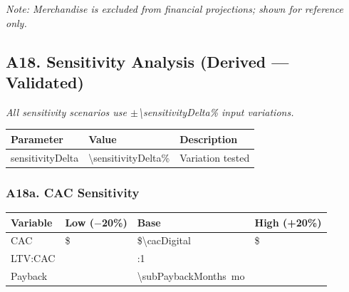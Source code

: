 \medskip
\textit{Note: Merchandise is excluded from financial projections; shown for reference only.}


\subsection*{A18. Sensitivity Analysis (Derived --- Validated)}

\textit{All sensitivity scenarios use $\pm$\num{\sensitivityDelta}\% input variations.}

\medskip
\begin{tabularx}{\linewidth}{l Y X}
\toprule
\textbf{Parameter} & \textbf{Value} & \textbf{Description} \\\midrule
sensitivityDelta & \num{\sensitivityDelta}\% & Variation tested \\
\bottomrule
\end{tabularx}

\subsubsection*{A18a. CAC Sensitivity}
\begin{tabularx}{\linewidth}{l Y Y Y}
\toprule
\textbf{Variable} & \textbf{Low ($-$20\%)} & \textbf{Base} & \textbf{High (+20\%)} \\\midrule
CAC & \$\validate{\sensCAClow}{\HCsensCAClow} & \$\num{\cacDigital} & \$\validate{\sensCAChigh}{\HCsensCAChigh} \\
LTV:CAC & \validateratio{\ltvCacLowCAC}{\HCltvCacLowCAC} & \numint{\ltvCacRatio}:1 & \validateratio{\ltvCacHighCAC}{\HCltvCacHighCAC} \\
Payback & \validatemonths{\paybackLowCAC}{\HCpaybackLowCAC} & \num{\subPaybackMonths}~mo & \validatemonths{\paybackHighCAC}{\HCpaybackHighCAC} \\
\bottomrule
\end{tabularx}


